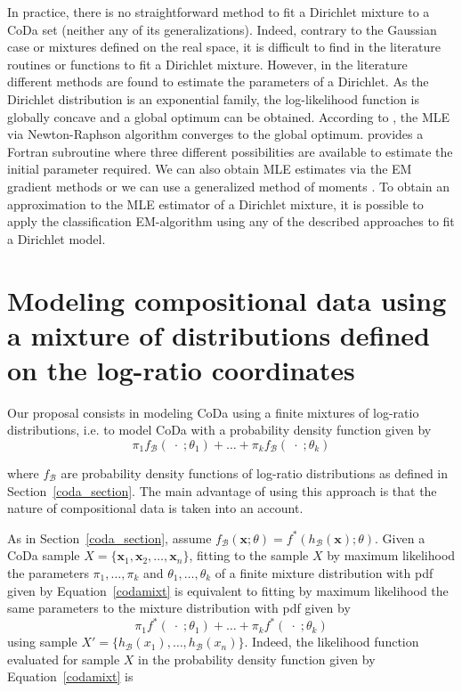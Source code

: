 \documentclass[10pt, a4paper]{article}
\begin{document}
In practice, there is no straightforward method to fit a Dirichlet mixture to a CoDa set (neither any of its generalizations). Indeed, contrary to the Gaussian case or mixtures defined on the real space, it is difficult to find in the literature routines or functions to fit a Dirichlet mixture. However, in the literature different methods are found to estimate the parameters of a Dirichlet. As the Dirichlet distribution is an exponential family, the log-likelihood function is globally concave and a global optimum can be obtained. According to \cite{ng2011dirichlet}, the MLE via Newton-Raphson algorithm converges to the global optimum. \cite{narayanan1991algorithm} provides a Fortran subroutine where three different possibilities are available to estimate the initial parameter required.
We can also obtain MLE estimates via the EM gradient methods \citep{ng2011dirichlet} or we can use a generalized method of moments
\citep{hansen1982large}.  
To obtain an approximation to the MLE estimator of a Dirichlet mixture, it is possible to apply the classification EM-algorithm \citep[CEM algorithm,][]{celeux1992classification} using any of the described approaches to fit a Dirichlet model.



\section{Modeling compositional data using a mixture of distributions defined on the log-ratio coordinates}
\label{codamix_section}

\noindent Our proposal consists in modeling CoDa using a finite mixtures of log-ratio distributions, i.e. to model CoDa with a probability density function given by 
\begin{equation}
\pi_1 f_\mathcal{B}(\;\cdot\; ; \theta_1) + \dots + \pi_k f_\mathcal{B}(\;\cdot\; ; \theta_k)
\label{codamixt}
\end{equation}

where $f_\mathcal{B}$ are probability density functions of log-ratio distributions as defined in Section~\ref{coda_section}. The main advantage of using this approach is that the nature of compositional data is taken into an account.

As in Section~\ref{coda_section}, assume $f_\mathcal{B}(\textbf{x} ; \theta) = f^*(h_\mathcal{B}(\textbf{x}) ; \theta)$. Given a CoDa sample $X =  \{ \textbf{x}_1, \textbf{x}_2, \dots , \textbf{x}_n \}$, fitting to the sample $X$ by maximum likelihood the parameters $\pi_1, \dots, \pi_k$ and $\theta_1, \dots, \theta_k$ of a finite mixture distribution with pdf given by Equation~\ref{codamixt} is equivalent to fitting by maximum likelihood the same parameters to the mixture distribution with pdf given by
\begin{equation}
\pi_1 f^*(\;\cdot\; ; \theta_1) + \dots + \pi_k f^*(\;\cdot\; ; \theta_k)
\label{coordmixt}
\end{equation}
using sample $X' = \{ h_\mathcal{B}(x_1), \dots, h_\mathcal{B}(x_n) \}$. Indeed, the likelihood function evaluated for sample $X$ in the probability density function given by Equation~\ref{codamixt} is
\end{document}
